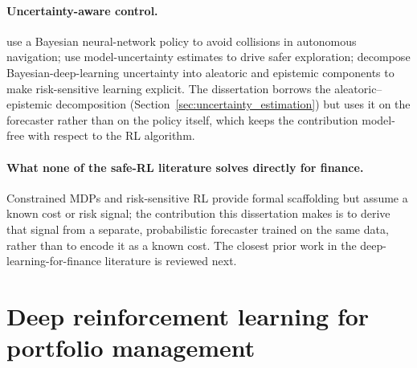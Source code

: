 \paragraph{Uncertainty-aware control.} \textcite{kahn2017uncertainty} use a Bayesian neural-network policy to avoid collisions in autonomous navigation; \textcite{lutjens2019safe} use model-uncertainty estimates to drive safer exploration; \textcite{depeweg2018decomposition} decompose Bayesian-deep-learning uncertainty into aleatoric and epistemic components to make risk-sensitive learning explicit. The dissertation borrows the aleatoric--epistemic decomposition (Section~\ref{sec:uncertainty_estimation}) but uses it on the forecaster rather than on the policy itself, which keeps the contribution model-free with respect to the RL algorithm.

\paragraph{What none of the safe-RL literature solves directly for finance.} Constrained MDPs and risk-sensitive RL provide formal scaffolding but assume a known cost or risk signal; the contribution this dissertation makes is to derive that signal from a separate, probabilistic forecaster trained on the same data, rather than to encode it as a known cost. The closest prior work in the deep-learning-for-finance literature is reviewed next.

\section{Deep reinforcement learning for portfolio management}
\label{sec:drl_for_finance}

